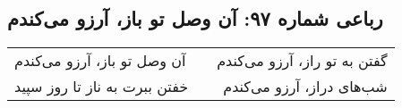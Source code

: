 \begin{center}
\section*{رباعی شماره ۹۷: آن وصل تو باز، آرزو می‌کندم}
\label{sec:097}
\begin{longtable}{l p{0.5cm} r}
آن وصل تو باز، آرزو می‌کندم
&&
گفتن به تو راز، آرزو می‌کندم
\\
خفتن ببرت به ناز تا روز سپید
&&
شب‌های دراز، آرزو می‌کندم
\\
\end{longtable}
\end{center}
